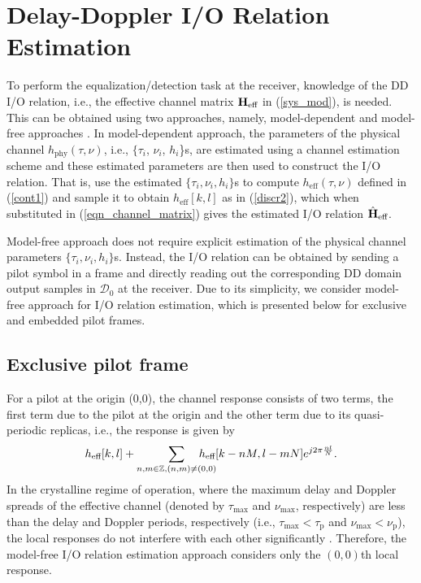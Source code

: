 \vspace{-1mm}
\section{Delay-Doppler I/O Relation Estimation}
\label{sec3}
To perform the equalization/detection task at the receiver, knowledge of the DD I/O relation, i.e., the effective channel matrix ${\bf H_\text{eff}}$ in (\ref{sys_mod}), is needed. This can be obtained using two approaches, namely, model-dependent and model-free approaches \cite{zak_otfs2}.
In model-dependent approach, the parameters of the physical channel $h_\text{phy}(\tau,\nu)$, i.e., $\{\tau_i$, $\nu_i$, $h_i$\}s, are estimated using a channel estimation scheme and these estimated parameters are then used to construct the I/O relation. That is, use the estimated $\{\tau_i,\nu_i,h_i\}$s to compute $h_\text{eff}(\tau,\nu)$ defined in (\ref{cont1}) 
and sample it to obtain $h_\text{eff}[k,l]$ as in (\ref{discr2}), which when substituted in (\ref{eqn_channel_matrix}) gives the estimated I/O relation $\hat{\bf H}_\text{eff}$.

Model-free approach does not require explicit estimation of the physical channel parameters
$\{\tau_i,\nu_i,h_i\}$s. Instead, the I/O relation can be obtained by sending a pilot symbol in a frame and directly reading out the corresponding DD domain output samples in $\mathcal{D}_0$ at the receiver. Due to its simplicity, we consider model-free approach for I/O relation estimation, which is presented below for exclusive and embedded pilot frames. 

\vspace{-2mm}
\subsection{Exclusive pilot frame}
For a pilot at the origin (0,0), the channel response consists of two terms, the first term due to the pilot at the origin and the other term due to its quasi-periodic replicas, i.e., the response is given by 
\begin{equation}
h_\text{eff}[k,l] + \sum_{n,m\in\mathbb{Z},\newline (n,m)\neq(0,0)}\hspace{-6mm}h_\text{eff}[k-nM,l-mN]e^{j2\pi\frac{nl}{N}}.
\label{c_rsp}
\end{equation}
In the crystalline regime of operation, where the maximum delay and Doppler spreads of the effective channel (denoted by $\tau_\text{max}$ and $\nu_\text{max}$, respectively) are less than the delay and Doppler periods, respectively (i.e., $\tau_{\mathrm{max}}<\tau_{\mathrm{p}}$ and $\nu_{\mathrm{max}}<\nu_{\mathrm{p}}$), the local responses do not interfere with each other significantly \cite{zak_otfs2}. Therefore, the model-free I/O relation estimation approach considers only the $(0,0)$th local response.  

